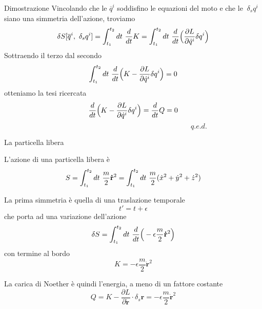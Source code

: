 \begin{frame}

    \begin{block}{Dimostrazione}
            Vincolando che le $\overline q^i$ soddisfino le equazioni del moto e che le $~\delta_s q^i$ siano una simmetria dell'azione, troviamo
        \begin{equation*}
            \delta S[\overline q^i, ~\delta_s q^i] = \int_{t_1}^{t_2}dt~ \frac{d}{dt} K = \int_{t_1}^{t_2}dt~ \frac{d}{dt} \Big( \frac{\partial L}{\partial\dot q^i} \delta q^i \Big )
        \end{equation*}
        Sottraendo il terzo dal secondo
        \begin{equation*}
            \int_{t_1}^{t_2}dt~ \frac{d}{dt} \Big (K - \frac{\partial L}{\partial\dot q^i} \delta q^i \Big ) = 0
        \end{equation*}
        otteniamo la tesi ricercata
        \begin{equation*}
            \frac{d}{dt} \Big (K - \frac{\partial L}{\partial\dot q^i} \delta q^i \Big ) = \frac{d}{dt} Q = 0
        \end{equation*}
        $\qquad \qquad \qquad \qquad \qquad \qquad \qquad \qquad \qquad \qquad \qquad \qquad \qquad q.e.d.$
    \end{block}

\end{frame}

\begin{frame}{La particella libera}

    L'azione di una particella libera è
    \begin{equation*}
        S = \int_{t_1}^{t_2}dt~ \frac{m}{2} \mathbf{\dot r}^2 = \int_{t_1}^{t_2}dt~ \frac{m}{2} (\dot x^2 + \dot y^2 + \dot z^2)
    \end{equation*} 

\end{frame}

\begin{frame}  

    La prima simmetria è quella di una traslazione temporale
    \begin{equation*}
        t' = t + \epsilon
    \end{equation*}
    che porta ad una variazione dell'azione
    \begin{equation*}
        \delta S = \int_{t_1}^{t_2}dt~ \frac{d}{dt} \Big( -\epsilon \frac{m}{2} \mathbf{\dot r}^2 \Big)
    \end{equation*}
    con termine al bordo 
    \begin{equation*}
        K = - \epsilon \frac{m}{2} \mathbf{\dot r}^2
    \end{equation*}
    
    La carica di Noether è quindi l'energia, a meno di un fattore costante
    \begin{equation*}
        Q = K - \frac{\partial L}{\partial \mathbf{\dot r}} \cdot \delta_s \mathbf r = - \epsilon \frac{m}{2} \mathbf{\dot r}^2 
    \end{equation*}

\end{frame}

